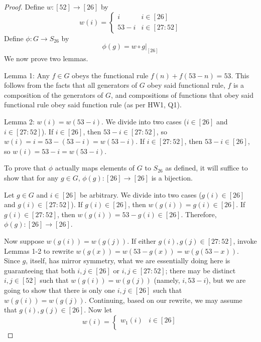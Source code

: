 \documentclass[../psets.tex]{subfiles}
\begin{document}
\begin{enumerate}
\begin{enumerate}
\begin{proof}
            Define $w:[52]\to[26]$ by
            \begin{equation*}
                w(i) =
                \begin{cases}
                    i & i\in[26]\\
                    53-i & i\in[27:52]
                \end{cases}
            \end{equation*}
            Define $\phi:G\to S_{26}$ by
            \begin{equation*}
                \phi(g) = w\circ g|_{[26]}
            \end{equation*}
            We now prove two lemmas.\par\smallskip
            Lemma 1: Any $f\in G$ obeys the functional rule $f(n)+f(53-n)=53$. This follows from the facts that all generators of $G$ obey said functional rule, $f$ is a composition of the generators of $G$, and compositions of functions that obey said functional rule obey said function rule (as per HW1, Q1).\par
            Lemma 2: $w(i)=w(53-i)$. We divide into two cases ($i\in[26]$ and $i\in[27:52]$). If $i\in[26]$, then $53-i\in[27:52]$, so $w(i)=i=53-(53-i)=w(53-i)$. If $i\in[27:52]$, then $53-i\in[26]$, so $w(i)=53-i=w(53-i)$.\par\smallskip
            To prove that $\phi$ actually maps elements of $G$ to $S_{26}$ as defined, it will suffice to show that for any $g\in G$, $\phi(g):[26]\to[26]$ is a bijection.\par
            Let $g\in G$ and $i\in[26]$ be arbitrary. We divide into two cases ($g(i)\in[26]$ and $g(i)\in[27:52]$). If $g(i)\in[26]$, then $w(g(i))=g(i)\in[26]$. If $g(i)\in[27:52]$, then $w(g(i))=53-g(i)\in[26]$. Therefore, $\phi(g):[26]\to[26]$.\par
            Now suppose $w(g(i))=w(g(j))$. If either $g(i),g(j)\in[27:52]$, invoke Lemmas 1-2 to rewrite $w(g(x))=w(53-g(x))=w(g(53-x))$. Since $g$, itself, has mirror symmetry, what we are essentially doing here is guaranteeing that both $i,j\in[26]$ or $i,j\in[27:52]$; there may be distinct $i,j\in[52]$ such that $w(g(i))=w(g(j))$ (namely, $i,53-i$), but we are going to show that there is only one $i,j\in[26]$ such that $w(g(i))=w(g(j))$. Continuing, based on our rewrite, we may assume that $g(i),g(j)\in[26]$. Now let
            \begin{equation*}
                w(i) =
                \begin{cases}
                    w_1(i) & i\in[26]\\

\end{cases}
\end{equation*}
\end{proof}
\end{enumerate}
\end{enumerate}
\end{document}
